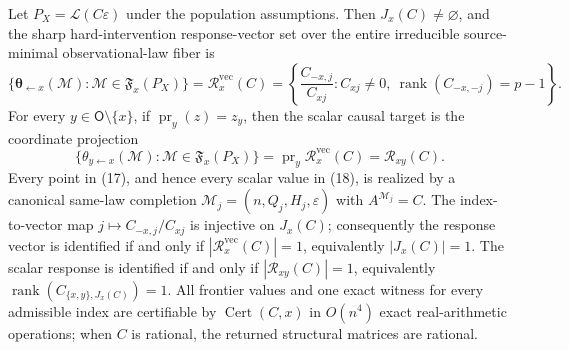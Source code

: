 Let \(P_X=\mathcal L(C\varepsilon)\) under the population assumptions. Then \(J_x(C)\ne\varnothing\), and the sharp hard-intervention response-vector set over the entire irreducible source-minimal observational-law fiber is
\[
 \{\boldsymbol\theta_{\leftarrow x}(\mathcal M):\mathcal M\in\mathfrak F_x(P_X)\}
 =\mathcal R_x^{\mathrm{vec}}(C)
 =\left\{\frac{C_{-x,j}}{C_{xj}}:C_{xj}\ne0,\ \operatorname{rank}(C_{-x,-j})=p-1\right\}. \tag{17}
\]
For every \(y\in\mathsf O\setminus\{x\}\), if \(\operatorname{pr}_y(z)=z_y\), then the scalar causal target is the coordinate projection
\[
 \{\theta_{y\leftarrow x}(\mathcal M):\mathcal M\in\mathfrak F_x(P_X)\}
 =\operatorname{pr}_y\mathcal R_x^{\mathrm{vec}}(C)
 =\mathcal R_{xy}(C). \tag{18}
\]
Every point in (17), and hence every scalar value in (18), is realized by a canonical same-law completion \(\mathcal M_j=(n,Q_j,H_j,\varepsilon)\) with \(A^{\mathcal M_j}=C\). The index-to-vector map \(j\mapsto C_{-x,j}/C_{xj}\) is injective on \(J_x(C)\); consequently the response vector is identified if and only if \(|\mathcal R_x^{\mathrm{vec}}(C)|=1\), equivalently \(|J_x(C)|=1\). The scalar response is identified if and only if \(|\mathcal R_{xy}(C)|=1\), equivalently \(\operatorname{rank}(C_{\{x,y\},J_x(C)})=1\). All frontier values and one exact witness for every admissible index are certifiable by \(\operatorname{Cert}(C,x)\) in \(O(n^4)\) exact real-arithmetic operations; when \(C\) is rational, the returned structural matrices are rational.